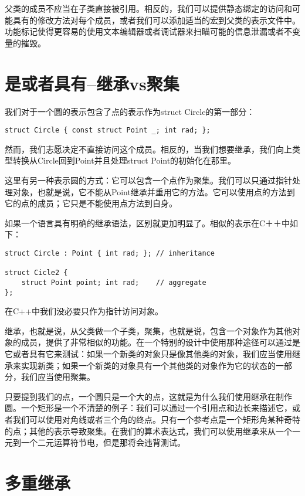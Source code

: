 父类的成员不应当在子类直接被引用。相反的，我们可以提供静态绑定的访问和可能具有的修改方法对每个成员，或者我们可以添加适当的宏到父类的表示文件中。功能标记使得更容易的使用文本编辑器或者调试器来扫瞄可能的信息泄漏或者不变量的摧毁。

\section{是或者具有--继承vs聚集}

我们对于一个圆的表示包含了点的表示作为struct Circle的第一部分：

\begin{lstlisting}
struct Circle { const struct Point _; int rad; };
\end{lstlisting}

然而，我们志愿决定不直接访问这个成员。相反的，当我们想要继承，我们向上类型转换从Circle回到Point并且处理struct Point的初始化在那里。

这里有另一种表示圆的方式：它可以包含一个点作为聚集。我们可以只通过指针处理对象，也就是说，它不能从Point继承并重用它的方法。它可以使用点的方法到它的点的成员；它只是不能使用点方法到自身。

如果一个语言具有明确的继承语法，区别就更加明显了。相似的表示在C＋＋中如下：

\begin{lstlisting}
struct Circle : Point { int rad; };	// inheritance

struct Cicle2 {
	struct Point point;	int rad;	// aggregate
};
\end{lstlisting}

在C++中我们没必要只作为指针访问对象。


继承，也就是说，从父类做一个子类，聚集，也就是说，包含一个对象作为其他对象的成员，提供了非常相似的功能。在一个特别的设计中使用那种途径可以通过是它或者具有它来测试：如果一个新类的对象只是像其他类的对象，我们应当使用继承来实现新类；如果一个新类的对象具有一个其他类的对象作为它的状态的一部分，我们应当使用聚集。

只要提到我们的点，一个圆只是一个大的点，这就是为什么我们使用继承在制作圆。一个矩形是一个不清楚的例子：我们可以通过一个引用点和边长来描述它，或者我们可以使用对角线或者三个角的终点。只有一个参考点是一个矩形角某种奇特的点；其他的表示导致聚集。在我们的算术表达式，我们可以使用继承来从一个一元到一个二元运算符节电，但是那将会违背测试。

\section{多重继承}

